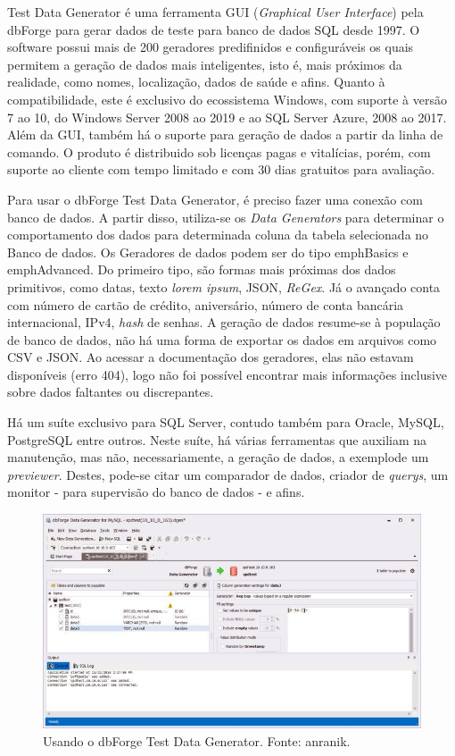 \documentclass[
	12pt,				%
	openright,			%
	twoside,			%
	a4paper,			%
	english,			%
	brazil				%
	]{abntex2}
\begin{document}
		Test Data Generator \cite{forgeDBDataGenerator} é uma ferramenta GUI (\emph{Graphical User Interface}) pela dbForge para gerar dados de teste para banco de dados SQL desde 1997.
		O software possui mais de 200 geradores predifinidos e configuráveis os quais permitem a geração de dados mais inteligentes, isto é, mais próximos da realidade, como nomes, localização, dados de saúde e afins.
		Quanto à compatibilidade, este é exclusivo do ecossistema Windows, com suporte à versão 7 ao 10, do Windows Server 2008 ao 2019 e ao SQL Server Azure, 2008 ao 2017.
		Além da GUI, também há o suporte para geração de dados a partir da linha de comando.
		O produto é distribuido sob licenças pagas e vitalícias, porém, com suporte ao cliente com tempo limitado e com 30 dias gratuitos para avaliação.
		\par
		Para usar o dbForge Test Data Generator, é preciso fazer uma conexão com banco de dados. 
		A partir disso, utiliza-se os \emph{Data Generators} para determinar o comportamento dos dados para determinada coluna da tabela selecionada no Banco de dados.
		Os Geradores de dados podem ser do tipo emph{Basics} e emph{Advanced}. 
		Do primeiro tipo, são formas mais próximas dos dados primitivos, como datas, texto \emph{lorem ipsum}, JSON, \emph{ReGex}.
		Já o avançado conta com número de cartão de crédito, aniversário, número de conta bancária internacional, IPv4, \emph{hash} de senhas.  
		A geração de dados resume-se à população de banco de dados, não há uma forma de exportar os dados em arquivos como CSV e JSON.
		Ao acessar a documentação \cite{forgeDBDataGeneratorDoc} dos geradores, elas não estavam disponíveis (erro 404), logo não foi possível encontrar mais informações inclusive sobre dados faltantes ou discrepantes.
		\par
		Há um suíte exclusivo para SQL Server, contudo também para Oracle, MySQL, PostgreSQL entre outros.
		Neste suíte, há várias ferramentas que auxiliam na manutenção, mas não, necessariamente, a geração de dados, a exemplode um \emph{previewer}.
		Destes, pode-se citar um comparador de dados, criador de \emph{querys}, um monitor - para supervisão do banco de dados - e afins.
		\begin{figure}[h]
			\centering
			\includegraphics[width=\linewidth]{./figures/TrabalhosRelacionados/dbForge-Test-Data-Generator.jpg}
			\caption{Usando o dbForge Test Data Generator. Fonte: anranik.}
			\label{fig:dbForgeTDG}
		\end{figure}
\end{document}
